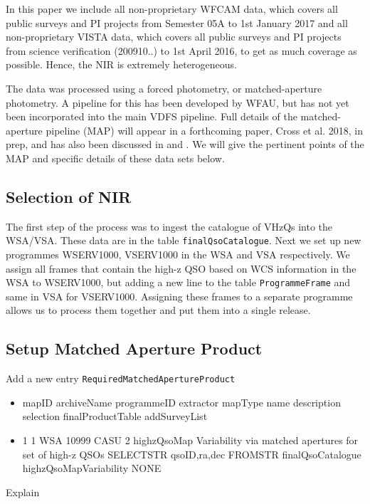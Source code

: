\documentclass[usenatbib]{mnras}
\begin{document}
In this paper we include all non-proprietary WFCAM data, which covers all
public surveys and PI projects from Semester 05A to 1st January 2017 and all
non-proprietary VISTA data, which covers all public surveys and PI projects from
science verification (200910..) to 1st April 2016, to get as much coverage as
possible. Hence, the NIR is extremely heterogeneous. 

The data was processed using a forced photometry, or matched-aperture
photometry. A pipeline for this has been developed by WFAU, but
has not yet been incorporated into the main VDFS pipeline. Full details of the
matched-aperture pipeline (MAP) will appear in a forthcoming paper, Cross et al.
2018, in prep, and has also been discussed in \citet{Cross2013} and \citet{Cross2017}.
We will give the pertinent points of the MAP and specific details of these data sets below.


\subsection{Selection of NIR}

The first step of the process was to ingest the catalogue of VHzQs into
the WSA/VSA. These data are in the table \verb+finalQsoCatalogue+. Next we set
up new programmes WSERV1000, VSERV1000 in the WSA and VSA respectively. We
assign all frames that contain the high-z QSO based on WCS information in the
WSA to WSERV1000, but adding a new line to the table \verb+ProgrammeFrame+ and
same in VSA for VSERV1000. Assigning these frames to a separate programme allows
us to process them together and put them into a single release. 

\subsection{Setup Matched Aperture Product}

Add a new entry \verb+RequiredMatchedApertureProduct+

\begin{itemize}
\item mapID	archiveName	programmeID	extractor	mapType	name	description	selection	finalProductTable	addSurveyList
\item 1	1	WSA	10999	CASU	2	highzQsoMap	Variability via matched apertures for set of high-z QSOs	SELECTSTR qsoID,ra,dec FROMSTR finalQsoCatalogue	highzQsoMapVariability	NONE
\end{itemize}

Explain
\end{document}
